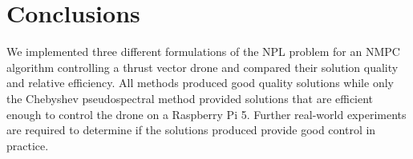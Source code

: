 \documentclass[]{article}
\begin{document}
\section*{Conclusions}
We implemented three different formulations of the NPL problem for an NMPC algorithm controlling a thrust vector drone and compared their solution quality and relative efficiency. All methods produced good quality solutions while only the Chebyshev pseudospectral method provided solutions that are efficient enough to control the drone on a Raspberry Pi 5. Further real-world experiments are required to determine if the solutions produced provide good control in practice.
	
	
%	


\end{document}
